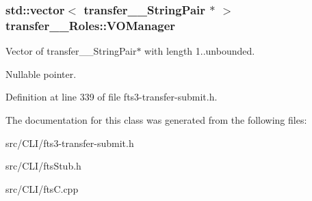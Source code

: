 \subsubsection[{VOManager}]{\setlength{\rightskip}{0pt plus 5cm}std::vector$<$ {\bf transfer\_\-\_\-StringPair} $\ast$ $>$ {\bf transfer\_\-\_\-Roles::VOManager}}\label{classtransfer____Roles_a884cb0c736ca8f9a3ea6a5fa5adb9250}


Vector of transfer\_\-\_\-StringPair$\ast$ with length 1..unbounded. 

Nullable pointer. 

Definition at line 339 of file fts3-\/transfer-\/submit.h.



The documentation for this class was generated from the following files:\begin{DoxyCompactItemize}
\item 
src/CLI/fts3-\/transfer-\/submit.h\item 
src/CLI/ftsStub.h\item 
src/CLI/ftsC.cpp\end{DoxyCompactItemize}

